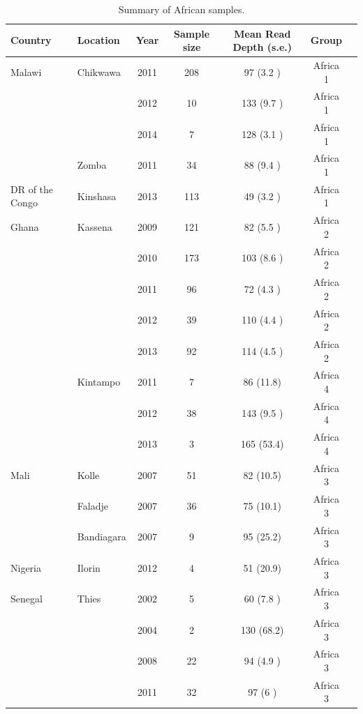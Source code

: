 \documentclass[9pt,lineno]{elife}
\begin{document}
\begin{table}[bt]
  \caption{Summary of African samples.}\label{tab:Pf3kAfrica}
\begin{tabular}{l l c c c c c}
\toprule
Country & Location & Year & Sample size & Mean Read Depth (s.e.) & Group \\
\midrule
Malawi          &Chikwawa       &2011 &208  &97   (3.2 )&Africa 1\\
                &               &2012 &10   &133  (9.7 )&Africa 1\\
                &               &2014 &7    &128  (3.1 )&Africa 1\\
                &Zomba          &2011 &34   &88   (9.4 )&Africa 1\\
 \hline
DR of the Congo &Kinshasa       &2013 &113  &49   (3.2 )&Africa 1\\
 \hline
Ghana           &Kassena        &2009 &121  &82   (5.5 )&Africa 2\\
                &               &2010 &173  &103  (8.6 )&Africa 2\\
                &               &2011 &96   &72   (4.3 )&Africa 2\\
                &               &2012 &39   &110  (4.4 )&Africa 2\\
                &               &2013 &92   &114  (4.5 )&Africa 2\\
                &Kintampo       &2011 &7    &86   (11.8)&Africa 4\\
                &               &2012 &38   &143  (9.5 )&Africa 4\\
                &               &2013 &3    &165  (53.4)&Africa 4\\
 \hline
Mali            &Kolle          &2007 &51   &82   (10.5)&Africa 3\\
                &Faladje        &2007 &36   &75   (10.1)&Africa 3\\
                &Bandiagara     &2007 &9    &95   (25.2)&Africa 3\\
 \hline
Nigeria         &Ilorin         &2012 &4    &51   (20.9)&Africa 3\\
 \hline
Senegal         &Thies          &2002 &5    &60   (7.8 )&Africa 3\\
                &               &2004 &2    &130  (68.2)&Africa 3\\
                &               &2008 &22   &94   (4.9 )&Africa 3\\
                &               &2011 &32   &97   (6   )&Africa 3\\

\end{tabular}
\end{table}
\end{document}
